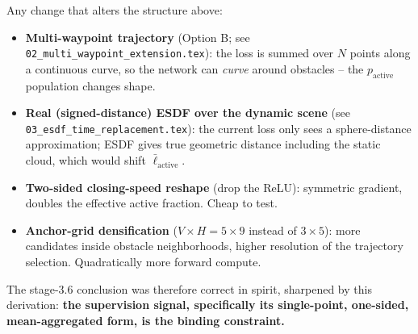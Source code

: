 \documentclass[11pt]{article}
\begin{document}
Any change that alters the structure above:
\begin{itemize}
  \item \textbf{Multi-waypoint trajectory} (Option B; see
        \texttt{02\_multi\_waypoint\_extension.tex}): the loss is summed over
        $N$ points along a continuous curve, so the network can \emph{curve}
        around obstacles -- the $p_{\text{active}}$ population changes shape.
  \item \textbf{Real (signed-distance) ESDF over the dynamic scene} (see
        \texttt{03\_esdf\_time\_replacement.tex}): the current loss only sees
        a sphere-distance approximation; ESDF gives true geometric distance
        including the static cloud, which would shift $\bar{\ell}_{\text{active}}$.
  \item \textbf{Two-sided closing-speed reshape} (drop the ReLU): symmetric
        gradient, doubles the effective active fraction. Cheap to test.
  \item \textbf{Anchor-grid densification} ($V \times H = 5 \times 9$ instead
        of $3 \times 5$): more candidates inside obstacle neighborhoods,
        higher resolution of the trajectory selection. Quadratically more
        forward compute.
\end{itemize}

The stage-3.6 conclusion was therefore correct in spirit, sharpened by this
derivation: \textbf{the supervision signal, specifically its single-point,
one-sided, mean-aggregated form, is the binding constraint.}
\end{document}
